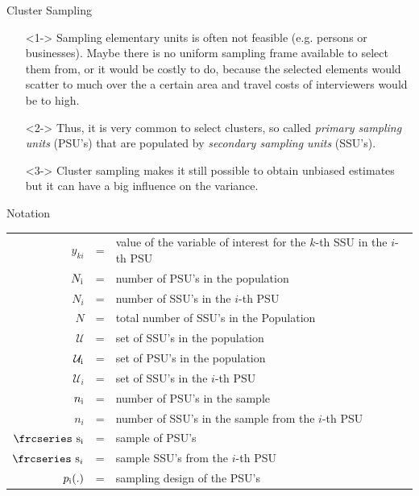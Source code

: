 \documentclass[10pt]{beamer}\usepackage[]{graphicx}\usepackage[]{color}
\newenvironment{knitrout}{}{} %
\newcommand{\textfrc}[1]{{\frcseries#1}}
\newcommand{\mathfrc}[1]{\text{\textfrc{#1}}}
\newcommand{\RN}[1]{%
  \textup{\uppercase\expandafter{\romannumeral#1}}%
}
\begin{document}


\begin{frame}{Cluster Sampling}
\begin{itemize}
\item[]<1-> Sampling elementary units is often not feasible (e.g. persons or businesses). Maybe there is no uniform sampling frame available to select them from, or it would be costly to do, because the selected elements would scatter to much over the a certain area and travel costs of interviewers would be to high. 

\item[]<2-> Thus, it is very common to select clusters, so called \emph{primary sampling units} (PSU's) that are populated by \emph{secondary sampling units} (SSU's).

\item[]<3-> Cluster sampling makes it still possible to obtain unbiased estimates but it can have a big influence on the variance. 
\end{itemize}

\end{frame}


\begin{frame}{Notation}
\begin{tabular}{rcp{8cm}}
$y_{ki}$      &=&value of the variable of interest for the $k$-th SSU in the $i$-th PSU \\
$N_{\RN{1}}$     &=&number of PSU's in the population \\
$N_i$       &=&number of SSU's in the $i$-th PSU \\
$N$         &=&total number of SSU's in the Population \\
$\mathcal{U}$  &=& set of SSU's in the population \\
$\mathcal{U}_{\RN{1}} $  &=& set of PSU's in the population \\
$\mathcal{U}_i$  &=& set of SSU's in the $i$-th PSU \\
$n_{\RN{1}}$         &=&number of PSU's in the sample \\
$n_i$   &=&number of SSU's in the sample from the $i$-th PSU\\
$\mathfrc{s}_{\RN{1}}$  &=& sample of PSU's \\
$\mathfrc{s}_i$         &=& sample SSU's from the $i$-th PSU \\ 
$p_{\RN{1}}(.)$         &=& sampling design of the PSU's \\
\end{tabular}

\end{frame}
\end{document}
